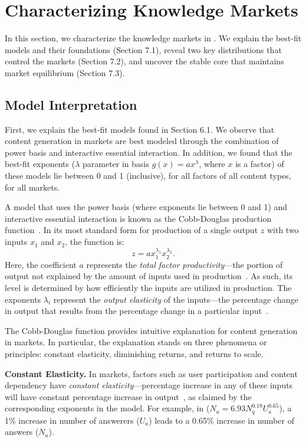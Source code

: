 \section{Characterizing Knowledge Markets}
In this section, we characterize the knowledge markets in . We explain the best-fit models and their foundations (Section 7.1), reveal two key distributions that control the markets (Section 7.2), and uncover the stable core that maintains market equilibrium (Section 7.3).

\subsection{Model Interpretation} 
First, we explain the best-fit models found in Section 6.1. We observe that content generation in  markets are best modeled through the combination of power basis and interactive essential interaction. In addition, we found that the best-fit exponents ($\lambda$ parameter in basis $g(x) = ax^\lambda$, where $x$ is a factor) of these models lie between 0 and 1 (inclusive), for all factors of all content types, for all  markets. 

A model that uses the power basis (where exponents lie between 0 and 1) and interactive essential interaction is known as the Cobb-Douglas production function~\cite{wiki}. In its most standard form for production of a single output $z$ with two inputs $x_1$ and $x_2$, the function is: 
$$z = ax_1^{\lambda_1}x_2^{\lambda_2}.$$
Here, the coefficient $a$ represents the \emph{total factor productivity}---the portion of output not explained by the amount of inputs used in production~\cite{wiki}. As such, its level is determined by how efficiently the inputs are utilized in production. The exponents $\lambda_i$ represent the \emph{output elasticity} of the inputs---the percentage change in output that results from the percentage change in a particular input~\cite{wiki}. 

The Cobb-Douglas function provides intuitive explanation for content generation in  markets. In particular, the explanation stands on three phenomena or principles: constant elasticity, diminishing returns, and returns to scale.

\textbf{Constant Elasticity.} In  markets, factors such as user participation and content dependency have \emph{constant elasticity}---percentage increase in any of these inputs will have constant percentage increase in output~\cite{wiki}, as claimed by the corresponding exponents in the model. For example, in  ($N_a = 6.93N_q^{0.18}U_a^{0.65}$), a 1\% increase in number of answerers ($U_a$) leads to a 0.65\% increase in number of answers ($N_a$). 

